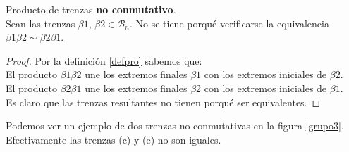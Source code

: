 \documentclass[14pt]{extarticle}
\begin{document}
\begin{pro} Producto de trenzas \textbf{no conmutativo}.\label{prodnocon}\\
	Sean las trenzas $\beta1$, $\beta2 \in \mathscr{B}_{n}$. No se tiene porqué verificarse la equivalencia $\beta1 \beta2 \sim \beta2 \beta1$.

	\begin{proof}	
		
		Por la definición \ref{defpro} sabemos que:\\
		El producto $\beta1 \beta2$ une los extremos finales $ \beta1 $ con los extremos iniciales de $\beta2 $. \\
		El producto $\beta2 \beta1$ une los extremos finales $ \beta2 $ con los extremos iniciales de $\beta1 $. \\
		
	    Es claro que las trenzas resultantes no tienen porqué ser equivalentes.
	\end{proof}
\end{pro}
Podemos ver un ejemplo de dos trenzas no conmutativas en la figura \ref{grupo3}. Efectivamente las trenzas (c) y (e) no son iguales.\\
\end{document}
